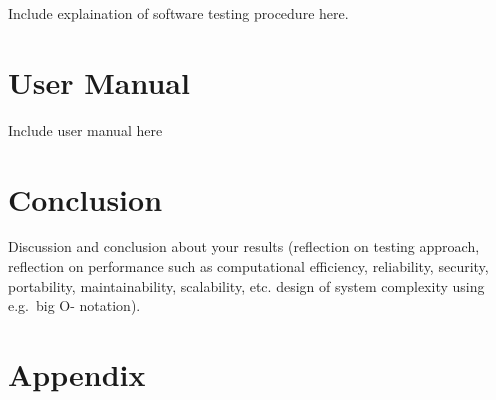 \documentclass[
  english,
  a4paper,
,tablecaptionabove
]{scrartcl}
\begin{document}
Include explaination of software testing procedure here.

\newpage

\hypertarget{user-manual}{%
\section{User Manual}\label{user-manual}}

Include user manual here

\newpage

\hypertarget{conclusion}{%
\section{Conclusion}\label{conclusion}}

Discussion and conclusion about your results (reflection on testing
approach, reflection on performance such as computational efficiency,
reliability, security, portability, maintainability, scalability, etc.
design of system complexity using e.g.~big O- notation).

\newpage

\hypertarget{appendix}{%
\section{Appendix}\label{appendix}}

\newpage
\end{document}
